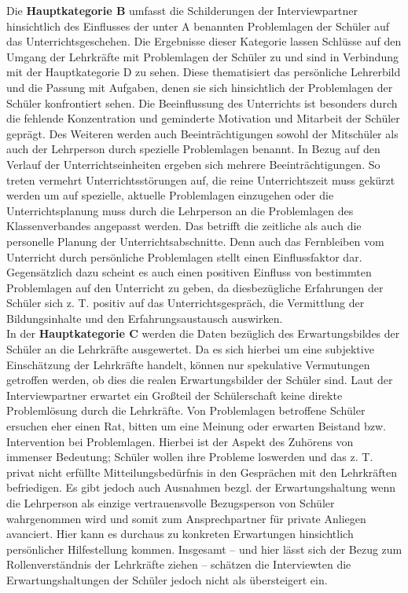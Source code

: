 \noindent
Die \textbf{Hauptkategorie B} umfasst die Schilderungen der Interviewpartner hinsichtlich des Einflusses der unter A benannten Problemlagen der Schüler auf das Unterrichtsgeschehen. Die Ergebnisse dieser Kategorie lassen Schlüsse auf den Umgang der Lehrkräfte mit Problemlagen der Schüler zu und sind in Verbindung mit der Hauptkategorie D zu sehen. Diese thematisiert das persönliche Lehrerbild und die Passung mit Aufgaben, denen sie sich hinsichtlich der Problemlagen der Schüler konfrontiert sehen. Die Beeinflussung des Unterrichts ist besonders durch die fehlende Konzentration und geminderte Motivation und Mitarbeit der Schüler geprägt. Des Weiteren werden auch Beeinträchtigungen sowohl der Mitschüler als auch der Lehrperson durch spezielle Problemlagen benannt. In Bezug auf den Verlauf der Unterrichtseinheiten ergeben sich mehrere Beeinträchtigungen. So treten vermehrt Unterrichtsstörungen auf, die reine Unterrichtszeit muss gekürzt werden um auf spezielle, aktuelle Problemlagen einzugehen oder die Unterrichtsplanung muss durch die Lehrperson an die Problemlagen des Klassenverbandes angepasst werden. Das betrifft die zeitliche als auch die personelle Planung der Unterrichtsabschnitte. Denn auch das Fernbleiben vom Unterricht durch persönliche Problemlagen stellt einen Einflussfaktor dar. Gegensätzlich dazu scheint es auch einen positiven Einfluss von bestimmten Problemlagen auf den Unterricht zu geben, da diesbezügliche Erfahrungen der Schüler sich z. T. positiv auf das Unterrichtsgespräch, die Vermittlung der Bildungsinhalte und den Erfahrungsaustausch auswirken.\\

\noindent
In der \textbf{Hauptkategorie C} werden die Daten bezüglich des Erwartungsbildes der Schüler an die Lehrkräfte ausgewertet. Da es sich hierbei um eine subjektive Einschätzung der Lehrkräfte handelt, können nur spekulative Vermutungen getroffen werden, ob dies die realen Erwartungsbilder der Schüler sind. Laut der Interviewpartner erwartet ein Großteil der Schülerschaft keine direkte Problemlösung durch die Lehrkräfte. Von Problemlagen betroffene Schüler ersuchen eher einen Rat, bitten um eine Meinung oder erwarten Beistand bzw. Intervention bei Problemlagen. Hierbei ist der Aspekt des Zuhörens von immenser Bedeutung; Schüler wollen ihre Probleme loswerden und das z. T. privat nicht erfüllte Mitteilungsbedürfnis in den Gesprächen mit den Lehrkräften befriedigen. Es gibt jedoch auch Ausnahmen bezgl. der Erwartungshaltung wenn die Lehrperson als einzige vertrauensvolle Bezugsperson von Schüler wahrgenommen wird und somit zum Ansprechpartner für private Anliegen avanciert. Hier kann es durchaus zu konkreten Erwartungen hinsichtlich persönlicher Hilfestellung kommen. Insgesamt -- und hier lässt sich der Bezug zum Rollenverständnis der Lehrkräfte ziehen -- schätzen die Interviewten die Erwartungshaltungen der Schüler jedoch nicht als übersteigert ein.\\

